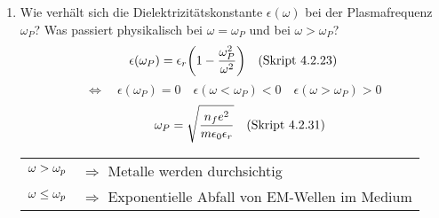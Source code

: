 \begin{enumerate}
  \item Wie verhält sich die Dielektrizitätskonstante $\epsilon(\omega)$
        bei der Plasmafrequenz $\omega_P$? Was passiert physikalisch bei
        $\omega=\omega_P$ und bei $\omega>\omega_P$?
        $$
        \epsilon(\omega_P)=\epsilon_r\qty(1-\frac{\omega_P^2}{\omega^2})
        \quad\text{(Skript 4.2.23)}$$
        $$\Leftrightarrow\quad\epsilon(\omega_P)=0
        \quad\epsilon(\omega<\omega_P)<0 
        \quad\epsilon(\omega>\omega_P)>0$$
        $$\quad\omega_P=\sqrt{\frac{n_fe^2}
        {m\epsilon_0\epsilon_r}}\quad\text{(Skript 4.2.31)}$$
        \begin{tabular}{rl}
          $\displaystyle\omega>\omega_p$ &$\Rightarrow$ 
          Metalle werden durchsichtig\\
          $\displaystyle\omega\le\omega_p$& $\Rightarrow$ Exponentielle 
          Abfall von EM-Wellen im Medium
        \end{tabular}
        \begin{center}
        \end{center}

\end{enumerate}
